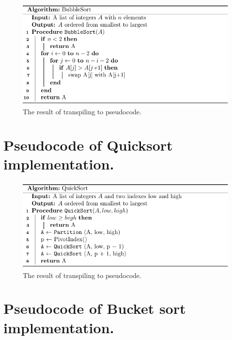 \begin{figure}[!htb]
    \centering
    \includegraphics[scale=.8]{assets/chapter6/sort/BubbleSort_tbp.pdf}
    \caption{The result of transpiling  to pseudocode.}
    \label{bubbleSortTBP}
\end{figure}

\section{Pseudocode of Quicksort implementation.}
\label{Pseudocode of Quicksort implementation.}


\begin{figure}[!htb]
    \centering
    \includegraphics[scale=.8]{assets/chapter6/sort/QuickSort_tbp.pdf}
    \caption{The result of transpiling  to pseudocode.}
    \label{quickSortTBP}
\end{figure}

\newpage

\section{Pseudocode of Bucket sort implementation.}
\label{Pseudocode of Bucket sort implementation.}

